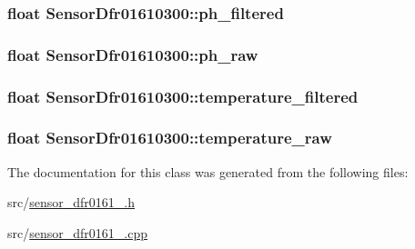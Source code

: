 \subsubsection[{ph\+\_\+filtered}]{\setlength{\rightskip}{0pt plus 5cm}float Sensor\+Dfr01610300\+::ph\+\_\+filtered}\label{class_sensor_dfr01610300_a09ae20cb63d44609c717dda168b8e454}
\hypertarget{class_sensor_dfr01610300_aa0ab70c745bde253adaa343afba56473}{}
\subsubsection[{ph\+\_\+raw}]{\setlength{\rightskip}{0pt plus 5cm}float Sensor\+Dfr01610300\+::ph\+\_\+raw}\label{class_sensor_dfr01610300_aa0ab70c745bde253adaa343afba56473}
\hypertarget{class_sensor_dfr01610300_a598f2f18f66d626a3ce392478fcadcc8}{}
\subsubsection[{temperature\+\_\+filtered}]{\setlength{\rightskip}{0pt plus 5cm}float Sensor\+Dfr01610300\+::temperature\+\_\+filtered}\label{class_sensor_dfr01610300_a598f2f18f66d626a3ce392478fcadcc8}
\hypertarget{class_sensor_dfr01610300_a483485c4c8a91569e8f45819e641e38c}{}
\subsubsection[{temperature\+\_\+raw}]{\setlength{\rightskip}{0pt plus 5cm}float Sensor\+Dfr01610300\+::temperature\+\_\+raw}\label{class_sensor_dfr01610300_a483485c4c8a91569e8f45819e641e38c}


The documentation for this class was generated from the following files\+:\begin{DoxyCompactItemize}
\item 
src/\hyperlink{sensor__dfr0161__0300_8h}{sensor\+\_\+dfr0161\+\_.\+h}\item 
src/\hyperlink{sensor__dfr0161__0300_8cpp}{sensor\+\_\+dfr0161\+\_.\+cpp}\end{DoxyCompactItemize}
